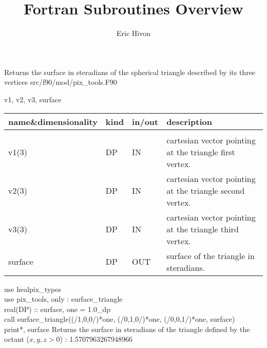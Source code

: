 
\sloppy


\title{\healpix Fortran Subroutines Overview}
 \section[surface\_triangle]{ }
\label{sub:surface_triangle}
\author{Eric Hivon}

\begin{facility}
{Returns the surface in steradians of the spherical triangle described by its
three vertices} 
{src/f90/mod/pix\_tools.F90}
\end{facility}

\begin{f90format}
{v1, v2, v3, surface}
\end{f90format}

\begin{arguments}
{
\begin{tabular}{p{0.25\hsize} p{0.05\hsize} p{0.1\hsize} p{0.5\hsize}} \hline 
\textbf{name\&dimensionality} & \textbf{kind} & \textbf{in/out} & \textbf{description} \\ \hline
                   &   &   &                           \\ %
v1(3) & DP & IN & cartesian vector pointing at the triangle first vertex. \\
v2(3) & DP & IN & cartesian vector pointing at the triangle second vertex. \\
v3(3) & DP & IN & cartesian vector pointing at the triangle third vertex. \\
surface & DP & OUT & surface of the triangle in steradians.
\end{tabular}
}
\end{arguments}

\begin{example}
{
use healpix\_types \\
use pix\_tools,    only : surface\_triangle \\
real(DP) :: surface, one = 1.0\_dp \\
call surface\_triangle((/1,0,0/)*one, (/0,1,0/)*one, (/0,0,1/)*one, surface)  \\
print*, surface
}
{
Returns the surface in steradians of the triangle defined by the octant ($x,y,z>0$) : 1.5707963267948966
}
\end{example}


